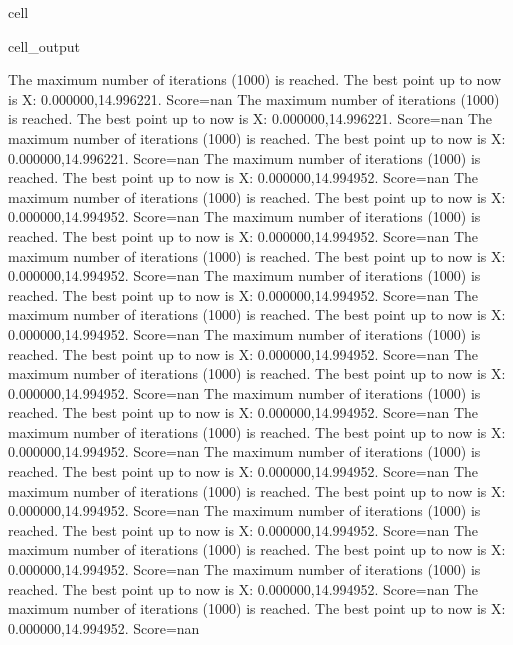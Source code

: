 \documentclass[letterpaper,10pt,english]{jupyterBook}
\begin{document}
\begin{sphinxuseclass}{cell}
\begin{sphinxVerbatimOutput}
\begin{sphinxuseclass}{cell_output}
\begin{sphinxVerbatim}[commandchars=\\\{\}]
The maximum number of iterations (1000) is reached. The best point up to now is X: \PYGZob{}0.000000,14.996221\PYGZcb{}. Score=\PYGZhy{}nan
The maximum number of iterations (1000) is reached. The best point up to now is X: \PYGZob{}0.000000,14.996221\PYGZcb{}. Score=\PYGZhy{}nan
The maximum number of iterations (1000) is reached. The best point up to now is X: \PYGZob{}0.000000,14.996221\PYGZcb{}. Score=\PYGZhy{}nan
The maximum number of iterations (1000) is reached. The best point up to now is X: \PYGZob{}0.000000,14.994952\PYGZcb{}. Score=\PYGZhy{}nan
The maximum number of iterations (1000) is reached. The best point up to now is X: \PYGZob{}0.000000,14.994952\PYGZcb{}. Score=\PYGZhy{}nan
The maximum number of iterations (1000) is reached. The best point up to now is X: \PYGZob{}0.000000,14.994952\PYGZcb{}. Score=\PYGZhy{}nan
The maximum number of iterations (1000) is reached. The best point up to now is X: \PYGZob{}0.000000,14.994952\PYGZcb{}. Score=\PYGZhy{}nan
The maximum number of iterations (1000) is reached. The best point up to now is X: \PYGZob{}0.000000,14.994952\PYGZcb{}. Score=\PYGZhy{}nan
The maximum number of iterations (1000) is reached. The best point up to now is X: \PYGZob{}0.000000,14.994952\PYGZcb{}. Score=\PYGZhy{}nan
The maximum number of iterations (1000) is reached. The best point up to now is X: \PYGZob{}0.000000,14.994952\PYGZcb{}. Score=\PYGZhy{}nan
The maximum number of iterations (1000) is reached. The best point up to now is X: \PYGZob{}0.000000,14.994952\PYGZcb{}. Score=\PYGZhy{}nan
The maximum number of iterations (1000) is reached. The best point up to now is X: \PYGZob{}0.000000,14.994952\PYGZcb{}. Score=\PYGZhy{}nan
The maximum number of iterations (1000) is reached. The best point up to now is X: \PYGZob{}0.000000,14.994952\PYGZcb{}. Score=\PYGZhy{}nan
The maximum number of iterations (1000) is reached. The best point up to now is X: \PYGZob{}0.000000,14.994952\PYGZcb{}. Score=\PYGZhy{}nan
The maximum number of iterations (1000) is reached. The best point up to now is X: \PYGZob{}0.000000,14.994952\PYGZcb{}. Score=\PYGZhy{}nan
The maximum number of iterations (1000) is reached. The best point up to now is X: \PYGZob{}0.000000,14.994952\PYGZcb{}. Score=\PYGZhy{}nan
The maximum number of iterations (1000) is reached. The best point up to now is X: \PYGZob{}0.000000,14.994952\PYGZcb{}. Score=\PYGZhy{}nan
The maximum number of iterations (1000) is reached. The best point up to now is X: \PYGZob{}0.000000,14.994952\PYGZcb{}. Score=\PYGZhy{}nan
The maximum number of iterations (1000) is reached. The best point up to now is X: \PYGZob{}0.000000,14.994952\PYGZcb{}. Score=\PYGZhy{}nan

\end{sphinxVerbatim}
\end{sphinxuseclass}
\end{sphinxVerbatimOutput}
\end{sphinxuseclass}
\end{document}
